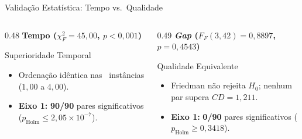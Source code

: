 \begin{frame}{Validação Estatística: Tempo vs.\ Qualidade \autocite{demsar2006statistical}}
  \begin{columns}[T,onlytextwidth]
    \begin{column}{0.48\textwidth}
      \centering
      {\footnotesize\bfseries\color{ufscBlue} Tempo ($\chi_F^2 = 45{,}00$, $p < 0{,}001$)}
      \slideTikz[0.36\textheight]{}{}
      \begin{exampleblock}{Superioridade Temporal}
        \begin{itemize}
          \item Ordenação idêntica nas \totalinstancias\ instâncias ($1{,}00$ a $4{,}00$).
          \item \textbf{Eixo 1:} \textbf{90/90} pares significativos ($p_{\text{Holm}} \le 2{,}05\times 10^{-7}$).
        \end{itemize}
      \end{exampleblock}
    \end{column}
    \begin{column}{0.49\textwidth}
      \centering
      {\footnotesize\bfseries\color{ufscDark} \emph{Gap} ($F_F(3,42) = 0{,}8897$, $p = 0{,}4543$)}
      \slideTikz[0.36\textheight]{}{}
      \begin{block}{Qualidade Equivalente}
        \begin{itemize}
          \item Friedman não rejeita $H_0$; nenhum par supera $CD = 1{,}211$.
          \item \textbf{Eixo 1:} \textbf{0/90} pares significativos ($p_{\text{Holm}} \ge 0{,}3418$).
        \end{itemize}
      \end{block}
    \end{column}
  \end{columns}
\end{frame}

